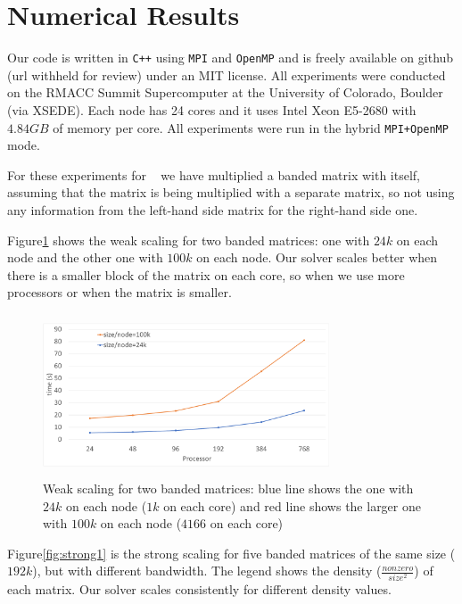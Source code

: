 \section{Numerical Results}
\label{sec:results}

Our code is written in \texttt{C++} using \texttt{MPI} and \texttt{OpenMP} and is freely available on github (url withheld for review) under an MIT license. 
All experiments were conducted on the RMACC Summit Supercomputer at the University of Colorado, Boulder (via XSEDE). Each node has 24 cores and it uses Intel Xeon E5-2680 with $4.84GB$ of memory per core. All experiments were run in the hybrid \texttt{MPI+OpenMP} mode. 


For these experiments for \mm~ we have multiplied a banded matrix with itself, assuming that the matrix is being multiplied with a separate matrix, so not using any information from the left-hand side matrix for the right-hand side one.

Figure\ref{fig:weak1} shows the weak scaling for two banded matrices: one with $24k$ on each node and the other one with $100k$ on each node. Our solver scales better when there is a smaller block of the matrix on each core, so when we use more processors or when the matrix is smaller.

\begin{figure}[tbh]
 \centering
 \includegraphics[width=8.5cm,height=4.8cm]{./figures/weak1.pdf}
 \caption{Weak scaling for two banded matrices: blue line shows the one with $24k$ on each node ($1k$ on each core) and red line shows the larger one with $100k$ on each node ($4166$ on each core)}
 \label{fig:weak1}
\end{figure}

Figure\ref{fig:strong1} is the strong scaling for five banded matrices of the same size ($192k$), but with different bandwidth. The legend shows the density ($\frac{nonzero}{size^2}$) of each matrix. Our solver scales consistently for different density values.

